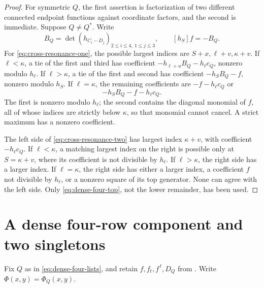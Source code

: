\documentclass[11pt,a4paper]{amsart}
\numberwithin{equation}{section}
\theoremstyle{plain}
\theoremstyle{definition}
\begin{document}
\begin{proof}
For symmetric \(Q\), the first assertion is factorization of two different connected endpoint functions against coordinate factors, and the second is immediate.  Suppose \(Q\ne Q^*\).  Write
\[
 B_Q=\det(h_{C_i-D_j})_{2\le i\le4,\ 1\le j\le3},
 \qquad [h_S]f=-B_Q.
\]
For \eqref{eq:cross-resonance-one}, the possible largest indices are
\(S+x,\ell+v,\kappa+v\).  If \(\ell<\kappa\), a tie of the first and third has coefficient
\(-h_{\ell+u}B_Q-h_\ell c_Q\), nonzero modulo \(h_\ell\).  If \(\ell>\kappa\), a tie of the first and second has coefficient \(-h_SB_Q-f\), nonzero modulo \(h_S\).  If \(\ell=\kappa\), the remaining coefficients are \(-f-h_\ell c_Q\) or
\[
 -h_SB_Q-f-h_\ell c_Q.
\]
The first is nonzero modulo \(h_\ell\); the second contains the diagonal monomial of \(f\), all of whose indices are strictly below \(\kappa\), so that monomial cannot cancel.  A strict maximum has a nonzero coefficient.

The left side of \eqref{eq:cross-resonance-two} has largest index \(\kappa+v\), with coefficient \(-h_\ell c_Q\).  If \(\ell<\kappa\), a matching largest index on the right is possible only at \(S=\kappa+v\), where its coefficient is not divisible by \(h_\ell\).  If \(\ell>\kappa\), the right side has a larger index.  If \(\ell=\kappa\), the right side has either a larger index, a coefficient \(f\) not divisible by \(h_\ell\), or a nonzero square of its top generator.  None can agree with the left side.  Only \eqref{eq:dense-four-top}, not the lower remainder, has been used.
\end{proof}

\section{A dense four-row component and two singletons}\label{sec:three-components}

Fix \(Q\) as in \eqref{eq:dense-four-lists}, and retain \(f,f_t,f^{\,t}, D_Q\) from .  Write \(\Phi(x,y)=\Phi_Q(x,y)\).
\end{document}
